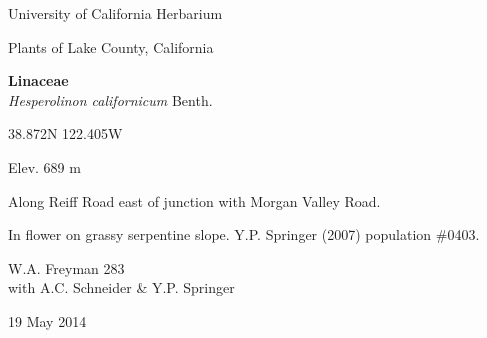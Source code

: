 \documentclass[letterpaper,10pt]{article}
\begin{document}
\begin{minipage}[t]{0.40\textwidth}

\begin{center}
University of California Herbarium \\
\begin{large}
Plants of Lake County, California \\
\end{large}
\vspace{\baselineskip}
\textbf{Linaceae} \\
\textit{Hesperolinon californicum} Benth.\\
\end{center}

\begin{footnotesize}

\begin{multicols}{2}
38.872\textdegree N 122.405\textdegree W
\columnbreak
\begin{flushright}
Elev. 689 m
\end{flushright}
\end{multicols}

Along Reiff Road east of junction with Morgan Valley Road.
\vspace{\baselineskip}

In flower on grassy serpentine slope. Y.P. Springer (2007) population \#0403.

\begin{multicols}{2}
W.A. Freyman 283 \\
with A.C. Schneider \& Y.P. Springer
\columnbreak
\begin{flushright}
19 May 2014
\end{flushright}
\end{multicols}

\end{footnotesize}

\end{minipage}

\vspace{2cm}
%
%

%
%
\end{document}
